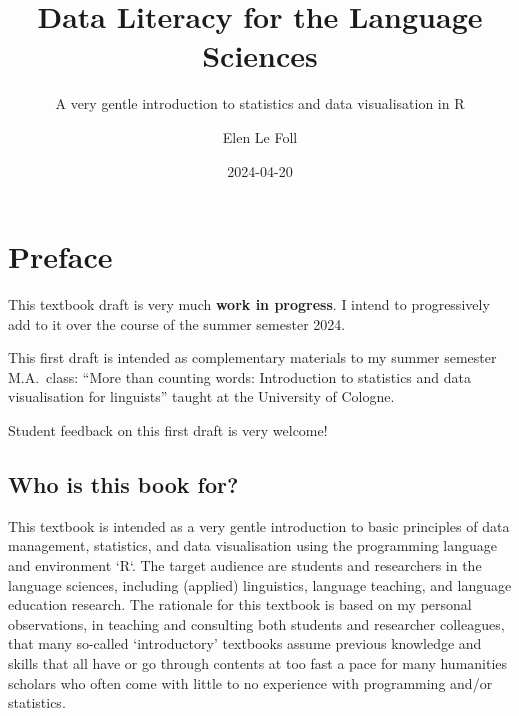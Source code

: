 \documentclass[
  letterpaper,
  DIV=11,
  numbers=noendperiod]{scrreprt}
\title{Data Literacy for the Language Sciences}
\subtitle{A very gentle introduction to statistics and data
visualisation in R}
\author{Elen Le Foll}
\date{2024-04-20}
\renewcommand*\contentsname{Table of contents}
\newcommand\contentsname{Table of contents}
\begin{document}
\maketitle

\renewcommand*\contentsname{Table of contents}
{
\hypersetup{linkcolor=}
\setcounter{tocdepth}{2}
\tableofcontents
}

\chapter*{Preface}\label{preface}


\begin{tcolorbox}[enhanced jigsaw, rightrule=.15mm, bottomrule=.15mm, coltitle=black, breakable, toprule=.15mm, colbacktitle=quarto-callout-warning-color!10!white, titlerule=0mm, colframe=quarto-callout-warning-color-frame, colback=white, arc=.35mm, left=2mm, opacitybacktitle=0.6, opacityback=0, bottomtitle=1mm, leftrule=.75mm, title=\textcolor{quarto-callout-warning-color}{\faExclamationTriangle}\hspace{0.5em}{Warning}, toptitle=1mm]

This textbook draft is very much \textbf{work in progress}. I intend to
progressively add to it over the course of the summer semester 2024.

This first draft is intended as complementary materials to my summer
semester M.A.~class: ``More than counting words: Introduction to
statistics and data visualisation for linguists'' taught at the
University of Cologne.

Student feedback on this first draft is very welcome!

\end{tcolorbox}

\section*{Who is this book for?}\label{who-is-this-book-for}


This textbook is intended as a very gentle introduction to basic
principles of data management, statistics, and data visualisation using
the programming language and environment `R`. The target audience are
students and researchers in the language sciences, including (applied)
linguistics, language teaching, and language education research. The
rationale for this textbook is based on my personal observations, in
teaching and consulting both students and researcher colleagues, that
many so-called `introductory' textbooks assume previous knowledge and
skills that all have or go through contents at too fast a pace for many
humanities scholars who often come with little to no experience with
programming and/or statistics.
\end{document}

